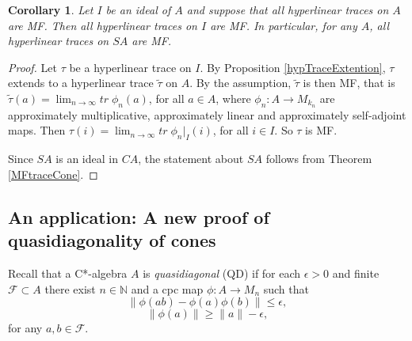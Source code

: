 \documentclass{article}%
\newtheorem{corollary}[theorem]{Corollary}
\newtheorem{remark}[theorem]{Remark}
\begin{document}
\begin{corollary}\label{suspension} Let $I$ be an  ideal of $A$ and suppose that all hyperlinear traces on $A$ are MF. Then all hyperlinear traces on $I$ are MF. In particular, for any $A$, all hyperlinear traces on $SA$ are MF.
\end{corollary}
\begin{proof} Let $\tau$ be a hyperlinear trace on $I$. By Proposition \ref{hypTraceExtention}, $\tau$ extends to a hyperlinear trace $\tilde \tau$ on $A$. By the assumption,  $\tilde \tau$ is then MF, that is
$\tilde\tau(a) = \lim_{n\to \infty} tr \; \phi_n(a)$, for all $a\in A$, where $\phi_n:A \to M_{k_n}$ are approximately multiplicative, approximately linear and approximately self-adjoint maps. Then  $\tau(i) = \lim_{n\to \infty} tr \; \phi_n|_I(i)$, for all $i\in I$. So $\tau$ is MF.

Since $SA$ is an ideal in $CA$, the statement about $SA$ follows from Theorem \ref{MFtraceCone}.
\end{proof}












\subsection{An application: A new proof of quasidiagonality of cones}


Recall that a C*-algebra $A$ is {\it quasidiagonal} (QD) if for each $\epsilon > 0$ and finite $\mathcal F \subset A$ there exist $n\in \mathbb N$ and a cpc map $\phi: A \to M_n$ such that
$$\|\phi(ab) - \phi(a)\phi(b)\|\le \epsilon,$$
$$\|\phi(a)\|\ge  \|a\|- \epsilon,$$
for any $a, b\in \mathcal F$.
\end{document}
